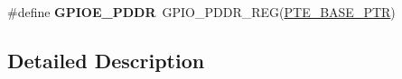 \begin{DoxyCompactItemize}
\item 
\hypertarget{group___g_p_i_o___register___accessor___macros_ga4ca5e050e0a711260b6d4dd0d3eabe76}{}\#define {\bfseries G\+P\+I\+O\+E\+\_\+\+P\+D\+D\+R}~G\+P\+I\+O\+\_\+\+P\+D\+D\+R\+\_\+\+R\+E\+G(\hyperlink{group___g_p_i_o___peripheral_gaa230685f72ad1540850ab8d12366775c}{P\+T\+E\+\_\+\+B\+A\+S\+E\+\_\+\+P\+T\+R})\label{group___g_p_i_o___register___accessor___macros_ga4ca5e050e0a711260b6d4dd0d3eabe76}

\end{DoxyCompactItemize}


\subsection{Detailed Description}
